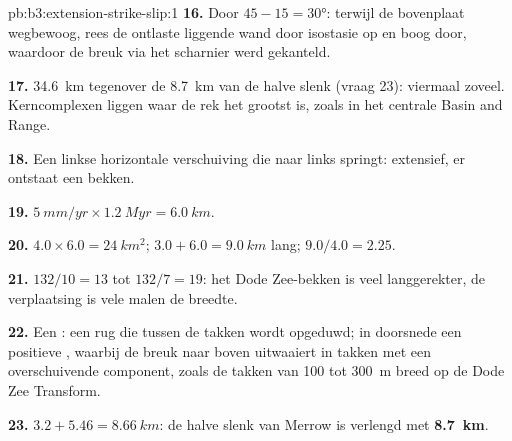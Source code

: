 \begin{solution}{pb:b3:extension-strike-slip:1}
\textbf{16.} Door $45 - 15 = \ang{30}$: terwijl de bovenplaat wegbewoog, rees de
ontlaste liggende wand door isostasie op en boog door, waardoor de breuk via het
scharnier werd gekanteld.

\textbf{17.} \qty{34.6}{km} tegenover de \qty{8.7}{km} van de halve slenk (vraag
23): viermaal zoveel. Kerncomplexen liggen waar de rek het grootst is, zoals in
het centrale Basin and Range.

\textbf{18.} Een linkse horizontale verschuiving die naar links springt: extensief, er ontstaat een bekken.

\textbf{19.} $\qty{5}{mm/yr}\times\qty{1.2}{Myr} = \qty{6.0}{km}$.

\textbf{20.} $4.0\times6.0 = \qty{24}{km^2}$; $3.0 + 6.0 = \qty{9.0}{km}$ lang;
$9.0/4.0 = 2.25$.

\textbf{21.} $132/10 = 13$ tot $132/7 = 19$: het Dode Zee-bekken is veel
langgerekter, de verplaatsing is vele malen de breedte.

\textbf{22.} Een : een rug die tussen de takken wordt opgeduwd; in
doorsnede een positieve , waarbij de breuk naar boven uitwaaiert in takken
met een overschuivende component, zoals de takken van 100 tot \qty{300}{m} breed op de
Dode Zee Transform.

\textbf{23.} $3.2 + 5.46 = \qty{8.66}{km}$: de halve slenk van Merrow is
verlengd met \textbf{\qty[text-series-to-math=true]{8.7}{km}}.
\end{solution}
